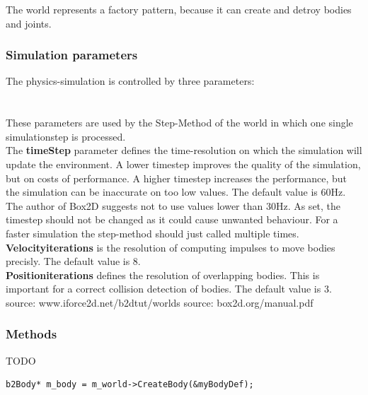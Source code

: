 \documentclass[10pt,a4paper,DIV=11]{scrreprt}
\begin{document}
The world represents a factory pattern, because it can create and detroy bodies and joints.

\subsubsection*{Simulation parameters}
The physics-simulation is controlled by three parameters: \\

   \\
\\

These parameters are used by the Step-Method of the world in which one single simulationstep is processed. \\

The \textbf{timeStep} parameter defines the time-resolution on which the simulation will update the environment. A lower timestep improves the quality of the simulation, but on costs of performance. A higher timestep increases the performance, but the simulation can be inaccurate on too low values.
The default value is 60Hz. The author of Box2D suggests not to use values lower than 30Hz. As set, the timestep should not be changed as it could cause unwanted behaviour. For a faster simulation the step-method should just called multiple times. \\


\textbf{Velocityiterations} is the resolution of computing impulses to move bodies precisly. The default value is 8. \\

\textbf{Positioniterations} defines the resolution of overlapping bodies. This is important for a correct collision detection of bodies. The default value is 3. \\


source: www.iforce2d.net/b2dtut/worlds
source: box2d.org/manual.pdf

\subsubsection*{Methods}
TODO
\begin{lstlisting}[caption={World creates a body},label=lst:world-body]
b2Body* m_body = m_world->CreateBody(&myBodyDef);
\end{lstlisting}
\end{document}
